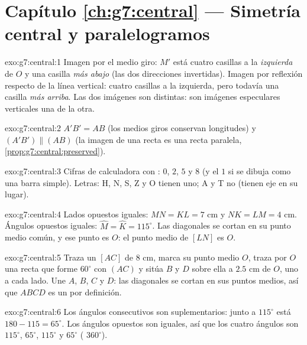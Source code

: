 \section*{Capítulo \ref{ch:g7:central} --- Simetría central y paralelogramos}

\begin{solution}{exo:g7:central:1}
Imagen por el medio giro: $M'$ está cuatro casillas a la \emph{izquierda} de $O$ y una
casilla \emph{más abajo} (las dos direcciones invertidas). Imagen por reflexión
respecto de la línea vertical: cuatro casillas a la izquierda, pero todavía una casilla
\emph{más arriba}. Las dos imágenes son distintas: son imágenes especulares verticales
una de la otra.
\end{solution}

\begin{solution}{exo:g7:central:2}
$A'B' = AB$ (los medios giros conservan longitudes) y
$(A'B') \parallel (AB)$ (la imagen de una recta es una recta paralela,
\cref{prop:g7:central:preserved}).
\end{solution}

\begin{solution}{exo:g7:central:3}
Cifras de calculadora con : $0$, $2$, $5$ y $8$ (y el
$1$ si se dibuja como una barra simple). Letras: H, N, S, Z y O tienen uno; A y
T no (tienen eje en su lugar).
\end{solution}

\begin{solution}{exo:g7:central:4}
Lados opuestos iguales: $MN = KL = 7$ cm y $NK = LM = 4$ cm. Ángulos
opuestos iguales: $\widehat M = \widehat K = 115^\circ$. Las diagonales
se cortan en su punto medio común, y ese punto es $O$: el
punto medio de $[LN]$ es $O$.
\end{solution}

\begin{solution}{exo:g7:central:5}
Traza un  $[AC]$ de $8$ cm, marca su punto medio $O$, traza por
$O$ una recta que forme $60^\circ$ con $(AC)$ y sitúa $B$ y $D$ sobre ella
a $2.5$ cm de $O$, uno a cada lado. Une $A$, $B$, $C$ y $D$: las
diagonales se cortan en sus puntos medios, así que $ABCD$ es un  por
definición.
\end{solution}

\begin{solution}{exo:g7:central:6}
Los ángulos consecutivos son suplementarios: junto a $115^\circ$ está
$180 - 115 = 65^\circ$. Los ángulos opuestos son iguales, así que los cuatro ángulos
son $115^\circ$, $65^\circ$, $115^\circ$ y $65^\circ$ (
$360^\circ$).
\end{solution}

